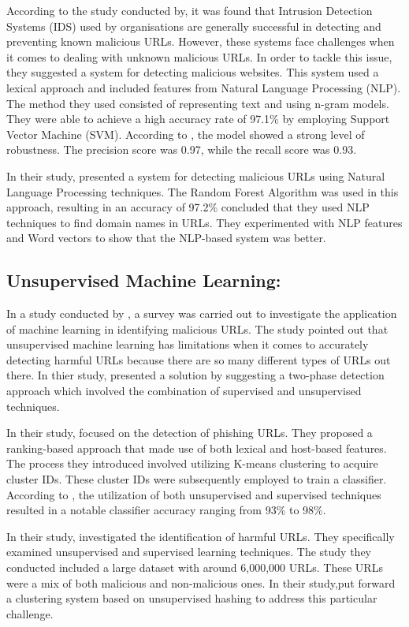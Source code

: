 According to the study conducted by\cite{Seong}, it was found that Intrusion Detection Systems (IDS) used by organisations are generally successful in detecting and preventing known malicious URLs. However, these systems face challenges when it comes to dealing with unknown malicious URLs. In order to tackle this issue, they suggested a system for detecting malicious websites. This system used a lexical approach and included features from Natural Language Processing (NLP). The method they used consisted of representing text and using n-gram models. They were able to achieve a high accuracy rate of 97.1\% by employing Support Vector Machine (SVM). According to \cite{Seong}, the model showed a strong level of robustness. The precision score was 0.97, while the recall score was 0.93.

In their study,\cite{Diri} presented a system for detecting malicious URLs using Natural Language Processing techniques. The Random Forest Algorithm was used in this approach, resulting in an accuracy of 97.2\%  concluded that they used NLP techniques to find domain names in URLs. They experimented with NLP features and Word vectors to show that the NLP-based system was better.

\subsection{Unsupervised Machine Learning:}
In a study conducted by \cite{mahesh2023using}, a survey was carried out to investigate the application of machine learning in identifying malicious URLs. The study pointed out that unsupervised machine learning has limitations when it comes to accurately detecting harmful URLs because there are so many different types of URLs out there. In thier study,\cite{Seong} presented a solution by suggesting a two-phase detection approach which involved the combination of supervised and unsupervised techniques.

In their study,\cite{Mohammed} focused on the detection of phishing URLs. They proposed a ranking-based approach that made use of both lexical and host-based features. The process they introduced involved utilizing K-means clustering to acquire cluster IDs. These cluster IDs were subsequently employed to train a classifier. According to \cite{Mohammed}, the utilization of both unsupervised and supervised techniques resulted in a notable classifier accuracy ranging from 93\% to 98\%.

In their study,\cite{Vanhoenshoven2016DetectingMU} investigated the identification of harmful URLs. They specifically examined unsupervised and supervised learning techniques. The study they conducted included a large dataset with around 6,000,000 URLs. These URLs were a mix of both malicious and non-malicious ones. In their study,\cite{Vanhoenshoven2016DetectingMU}put forward a clustering system based on unsupervised hashing to address this particular challenge.

